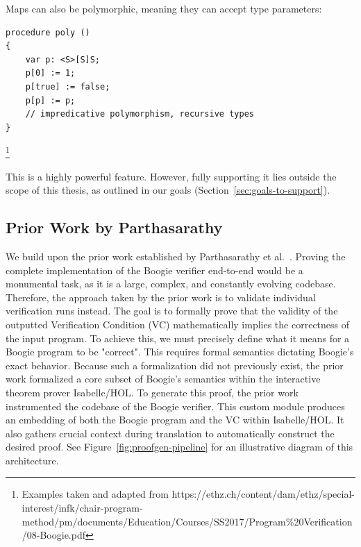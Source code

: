 \documentclass[11pt]{article}
\begin{document}
Maps can also be polymorphic, meaning they can accept type parameters:

\begin{verbatim}  
procedure poly ()
{
    var p: <S>[S]S;
    p[0] := 1;
    p[true] := false;
    p[p] := p; 
    // impredicative polymorphism, recursive types
}
\end{verbatim}

\footnote{Examples taken and adapted from https://ethz.ch/content/dam/ethz/special-interest/infk/chair-program-method/pm/documents/Education/Courses/SS2017/Program\%20Verification/08-Boogie.pdf}

This is a highly powerful feature. However, fully supporting it lies outside the scope of this thesis, as outlined in our goals (Section~\ref{sec:goals-to-support}).


\subsection{Prior Work by Parthasarathy}
\label{sec:prior-work}

We build upon the prior work established by Parthasarathy et al.~\cite{parthasarathy2021formally}.
Proving the complete implementation of the Boogie verifier end-to-end would be a monumental task,
as it is a large, complex, and constantly evolving codebase.
Therefore, the approach taken by the prior work is to validate individual verification runs instead.
The goal is to formally prove that the validity of the outputted Verification Condition (VC)
mathematically implies the correctness of the input program.
To achieve this, we must precisely define what it means for a Boogie program to be "correct".
This requires formal semantics dictating Boogie's exact behavior.
Because such a formalization did not previously exist,
the prior work formalized a core subset of Boogie's semantics within the interactive theorem prover Isabelle/HOL.
To generate this proof, the prior work instrumented the codebase of the Boogie verifier.
This custom module produces an embedding of both the Boogie program and the VC within Isabelle/HOL.
It also gathers crucial context during translation to automatically construct the desired proof.
See Figure~\ref{fig:proofgen-pipeline} for an illustrative diagram of this architecture.
\end{document}
